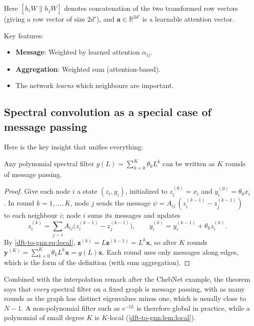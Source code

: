 \begin{notechapter}
\begin{example}
Here $[h_i W \| h_j W]$ denotes concatenation of the two transformed
row vectors (giving a row vector of size $2d'$), and
$\mathbf{a} \in \mathbb{R}^{2d'}$ is a learnable attention vector.

Key features:
\begin{itemize}
    \item \textbf{Message}: Weighted by learned attention $\alpha_{ij}$.
    \item \textbf{Aggregation}: Weighted sum (attention-based).
    \item The network \emph{learns} which neighbours are important.
\end{itemize}
\end{example}

\subsection{Spectral convolution as a special case of message passing}

Here is the key insight that unifies everything:

\begin{theorem}
Any polynomial spectral filter $g(L) = \sum_{k=0}^{K} \theta_k L^k$
can be written as $K$ rounds of message passing.
\end{theorem}

\begin{proof}
Give each node $i$ a state $(z_i, y_i)$, initialized to $z_i^{(0)} = x_i$ and $y_i^{(0)} = \theta_0 x_i$. In round $k = 1, \ldots, K$, node $j$ sends the message $\psi = A_{ij}\,(z_i^{(k-1)} - z_j^{(k-1)})$ to each neighbour $i$; node $i$ sums its messages and updates
\[
z_i^{(k)} = \sum_{j\sim i} A_{ij}\bigl(z_i^{(k-1)} - z_j^{(k-1)}\bigr), \qquad y_i^{(k)} = y_i^{(k-1)} + \theta_k z_i^{(k)} .
\]
By \eqref{dft-to-gnn:eq:local}, $\mathbf{z}^{(k)} = L\mathbf{z}^{(k-1)} = L^k\mathbf{x}$, so after $K$ rounds $\mathbf{y}^{(K)} = \sum_{k=0}^K\theta_kL^k\mathbf{x} = g(L)\mathbf{x}$. Each round uses only messages along edges, which is the form of the definition (with sum aggregation).
\end{proof}

\begin{remark}
Combined with the interpolation remark after the ChebNet example, the theorem says that \emph{every} spectral filter on a fixed graph is message passing, with as many rounds as the graph has distinct eigenvalues minus one, which is usually close to $N - 1$. A non-polynomial filter such as $e^{-tL}$ is therefore global in practice, while a polynomial of small degree $K$ is $K$-local (\cref{dft-to-gnn:lem:local}).
\end{remark}


\end{notechapter}
